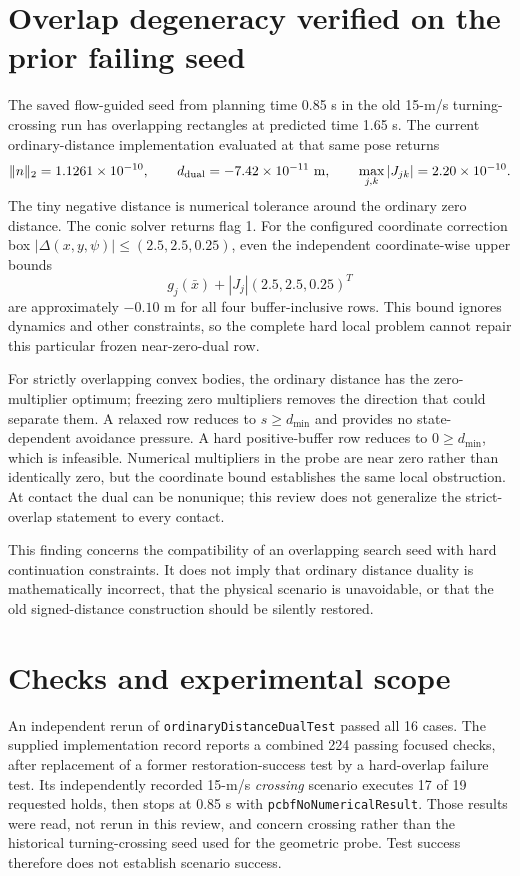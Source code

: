 \documentclass[11pt]{article}
\begin{document}
\section{Overlap degeneracy verified on the prior failing seed}
The saved flow-guided seed from planning time 0.85 s in the old
15-m/s turning-crossing run has overlapping rectangles at predicted time
1.65 s. The current ordinary-distance implementation evaluated at that same
pose returns
\[
 \|n\|_2=1.1261\times10^{-10},\qquad
 d_{\rm dual}=-7.42\times10^{-11}\ \mathrm m,
 \qquad \max_{j,k}|J_{jk}|=2.20\times10^{-10}.
\]
The tiny negative distance is numerical tolerance around the ordinary
zero distance. The conic solver returns flag 1. For the configured coordinate
correction box $|\Delta(x,y,\psi)|\le(2.5,2.5,0.25)$, even the independent
coordinate-wise upper bounds
\[
 g_j(\bar x)+|J_j|(2.5,2.5,0.25)^T
\]
are approximately $-0.10$ m for all four buffer-inclusive rows. This bound
ignores dynamics and other constraints, so the complete hard local problem
cannot repair this particular frozen near-zero-dual row.

For strictly overlapping convex bodies, the ordinary distance has the
zero-multiplier optimum; freezing zero multipliers removes the direction
that could separate them. A relaxed row reduces to $s\ge d_{\min}$ and
provides no state-dependent avoidance pressure. A hard positive-buffer row
reduces to $0\ge d_{\min}$, which is infeasible. Numerical multipliers in the
probe are near zero rather than identically zero, but the coordinate bound
establishes the same local obstruction. At contact the dual can be nonunique;
this review does not generalize the strict-overlap statement to every contact.

This finding concerns the compatibility of an overlapping search seed with
hard continuation constraints. It does not imply that ordinary distance duality
is mathematically incorrect, that the physical scenario is unavoidable, or
that the old signed-distance construction should be silently restored.

\section{Checks and experimental scope}
An independent rerun of \texttt{ordinaryDistanceDualTest} passed all 16 cases.
The supplied implementation record
reports a combined 224 passing focused checks, after replacement of a former
restoration-success test by a hard-overlap failure test. Its independently
recorded 15-m/s \emph{crossing} scenario executes 17 of 19 requested holds,
then stops at 0.85 s with \texttt{pcbfNoNumericalResult}. Those results were
read, not rerun in this review, and concern crossing rather than the historical
turning-crossing seed used for the geometric probe. Test success therefore
does not establish scenario success.
\end{document}
